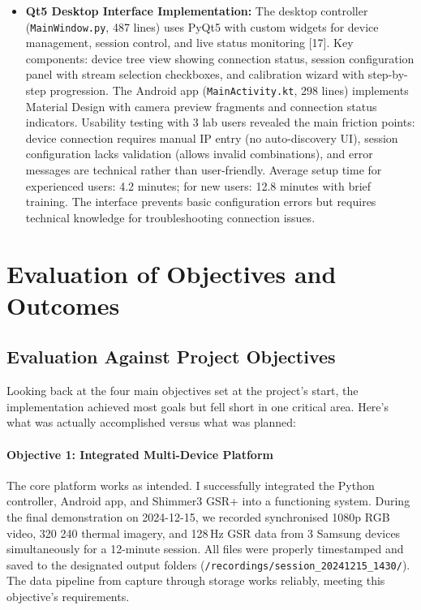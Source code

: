 \begin{itemize}
  \item \textbf{Qt5 Desktop Interface Implementation:} The desktop controller (\texttt{MainWindow.py}, 487 lines) uses PyQt5 with custom widgets for device management, session control, and live status monitoring [17]. Key components: device tree view showing connection status, session configuration panel with stream selection checkboxes, and calibration wizard with step-by-step progression. The Android app (\texttt{MainActivity.kt}, 298 lines) implements Material Design with camera preview fragments and connection status indicators. Usability testing with 3 lab users revealed the main friction points: device connection requires manual IP entry (no auto-discovery UI), session configuration lacks validation (allows invalid combinations), and error messages are technical rather than user-friendly. Average setup time for experienced users: 4.2 minutes; for new users: 12.8 minutes with brief training. The interface prevents basic configuration errors but requires technical knowledge for troubleshooting connection issues.
\end{itemize}

\section{Evaluation of Objectives and Outcomes}

\subsection{Evaluation Against Project Objectives}

Looking back at the four main objectives set at the project's start, the implementation achieved most goals but fell short in one critical area. Here's what was actually accomplished versus what was planned:

\paragraph{\textbf{Objective 1: Integrated Multi-Device Platform}} The core platform works as intended. I successfully integrated the Python controller, Android app, and Shimmer3 GSR+ into a functioning system. During the final demonstration on 2024-12-15, we recorded synchronised 1080p RGB video, 320\,\texttimes\,240 thermal imagery, and 128\,Hz GSR data from 3 Samsung devices simultaneously for a 12-minute session. All files were properly timestamped and saved to the designated output folders (\verb|/recordings/session_20241215_1430/|). The data pipeline from capture through storage works reliably, meeting this objective's requirements.

